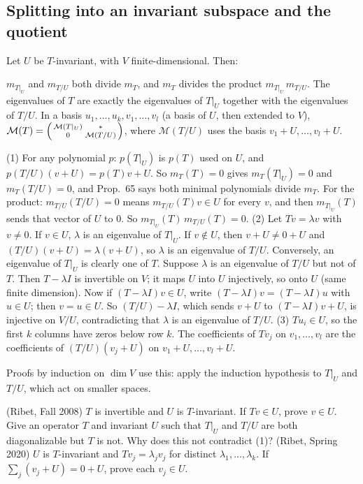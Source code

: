 \documentclass[10pt]{scrartcl}
\newcommand{\MM}{\mathcal M}
\begin{document}
\subsection{Splitting into an invariant subspace and the quotient}\label{sec:T5}
\begin{theorem*}[T5]
  Let $U$ be $T$-invariant, with $V$ finite-dimensional. Then:
  \begin{enumerate}
    \ii $m_{T|_U}$ and $m_{T/U}$ both divide $m_T$, and $m_T$ divides the product $m_{T|_U}\,m_{T/U}$.
    \ii The eigenvalues of $T$ are exactly the eigenvalues of $T|_U$ together with the eigenvalues of $T/U$.
    \ii In a basis $u_1,\dots,u_k,v_1,\dots,v_l$ (a basis of $U$, then extended to $V$), $\MM(T)=\begin{psmallmatrix}\MM(T|_U)&*\\0&\MM(T/U)\end{psmallmatrix}$, where $\MM(T/U)$ uses the basis $v_1+U,\dots,v_l+U$.
  \end{enumerate}
\end{theorem*}
\why (1) For any polynomial $p$: $p(T|_U)$ is $p(T)$ used on $U$, and $p(T/U)(v+U)=p(T)v+U$. So $m_T(T)=0$ gives $m_T(T|_U)=0$ and $m_T(T/U)=0$, and Prop.~65 says both minimal polynomials divide $m_T$. For the product: $m_{T/U}(T/U)=0$ means $m_{T/U}(T)v\in U$ for every $v$, and then $m_{T|_U}(T)$ sends that vector of $U$ to $0$. So $m_{T|_U}(T)\,m_{T/U}(T)=0$.
(2) Let $Tv=\lambda v$ with $v\ne0$. If $v\in U$, $\lambda$ is an eigenvalue of $T|_U$. If $v\notin U$, then $v+U\ne0+U$ and $(T/U)(v+U)=\lambda(v+U)$, so $\lambda$ is an eigenvalue of $T/U$. Conversely, an eigenvalue of $T|_U$ is clearly one of $T$. Suppose $\lambda$ is an eigenvalue of $T/U$ but not of $T$. Then $T-\lambda I$ is invertible on $V$; it maps $U$ into $U$ injectively, so onto $U$ (same finite dimension). Now if $(T-\lambda I)v\in U$, write $(T-\lambda I)v=(T-\lambda I)u$ with $u\in U$; then $v=u\in U$. So $(T/U)-\lambda I$, which sends $v+U$ to $(T-\lambda I)v+U$, is injective on $V/U$, contradicting that $\lambda$ is an eigenvalue of $T/U$.
(3) $Tu_i\in U$, so the first $k$ columns have zeros below row $k$. The coefficients of $Tv_j$ on $v_1,\dots,v_l$ are the coefficients of $(T/U)(v_j+U)$ on $v_1+U,\dots,v_l+U$.

Proofs by induction on $\dim V$ use this: apply the induction hypothesis to $T|_U$ and $T/U$, which act on smaller spaces.
\probs
\begin{enumerate}[(a)]
  \ii (Ribet, Fall 2008) $T$ is invertible and $U$ is $T$-invariant. If $Tv\in U$, prove $v\in U$.
  \ii Give an operator $T$ and invariant $U$ such that $T|_U$ and $T/U$ are both diagonalizable but $T$ is not. Why does this not contradict (1)?
  \ii (Ribet, Spring 2020) $U$ is $T$-invariant and $Tv_j=\lambda_jv_j$ for distinct $\lambda_1,\dots,\lambda_k$. If $\sum_j(v_j+U)=0+U$, prove each $v_j\in U$.
\end{enumerate}
\end{document}
